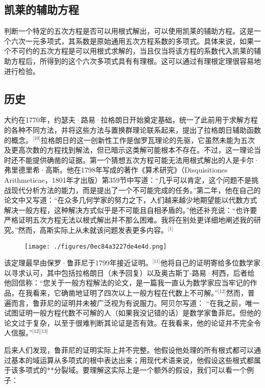 \subsection{凯莱的辅助方程}
判断一个特定的五次方程是否可以用根式解出，可以使用凯莱的辅助方程。这是一个六次一元多项式，其系数是原始通用五次方程系数的多项式。具体来说，如果一个不可约的五次方程是可以用根式求解的，当且仅当将该方程的系数代入凯莱的辅助方程后，所得到的这个六次多项式具有有理根。这可以通过有理根定理很容易地进行检验。
\subsection{历史}
大约在1770年，约瑟夫·路易·拉格朗日开始奠定基础，统一了此前用于求解方程的各种不同方法，并将这些方法与置换群理论联系起来，提出了拉格朗日辅助函数的概念。\(^\text{[10]}\)拉格朗日的这一创新性工作是伽罗瓦理论的先驱，它虽然未能为五次及更高次数的方程找到解法，但已暗示这类解可能根本不存在。不过，这一理论当时还不能提供确凿的证据。第一个猜想五次方程可能无法用根式解出的人是卡尔·弗里德里希·高斯。他在1798年写成的著作《算术研究》（Disquisitiones Arithmeticae，1801年才出版）第359节中写道：“几乎可以肯定，这个问题不是挑战现代分析方法的能力，而是提出了一个不可能完成的任务。”第二年，他在自己的论文中又写道：“在众多几何学家的努力之下，人们越来越少地期望能以代数方式解决一般方程，这种解决方式似乎是不可能且自相矛盾的。”他还补充说：“也许要严格证明五次方程无法以根式解出并不那么困难。我将在别处更详细地阐述我的研究。”然而，高斯实际上从未就该问题发表更多内容。\(^\text{[1]}\)
\begin{figure}[ht]
\centering
\texttt{[image: ./figures/0ec84a3227de4e4d.png]}
\caption{} \label{fig_ABRR_1}
\end{figure}
该定理最早由保罗·鲁菲尼于1799年接近证明。\(^\text{[11]}\)他将自己的证明寄给多位数学家以寻求认可，其中包括拉格朗日（未予回复）以及奥古斯丁-路易·柯西，后者给他回信称：“您关于一般方程解法的论文，是一篇我一直认为数学家应当牢记的作品，在我看来，它确凿地证明了四次以上一般方程在代数上不可解。”\(^\text{[12]}\)然而，普遍而言，鲁菲尼的证明并未被广泛视为有说服力。阿贝尔写道： “在我之前，唯一试图证明一般方程代数不可解的人（如果我没记错的话）是数学家鲁菲尼。但他的论文过于复杂，以至于很难判断其论证是否有效。在我看来，他的论证并不完全令人信服。”\(^\text{[12][13]}\)

后来人们发现，鲁菲尼的证明实际上并不完整。他假设他处理的所有根式都可以通过基本的域运算从多项式的根中表达出来；用现代术语来说，他假设这些根式都属于该多项式的**分裂域。要理解这实际上是一个额外的假设，我们可以看一个例子：


